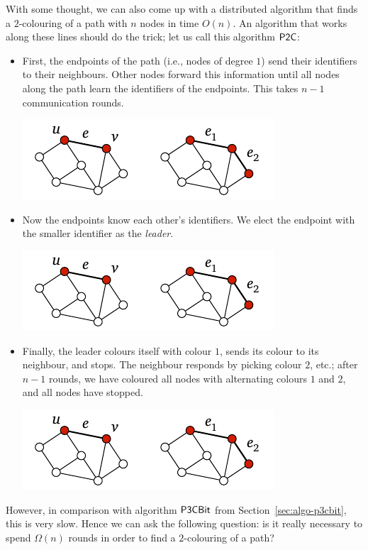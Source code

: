 With some thought, we can also come up with a distributed algorithm that finds a $2$-colouring of a path with $n$ nodes in time $O(n)$. An algorithm that works along these lines should do the trick; let us call this algorithm $\textup{\sffamily P2C}$:
\begin{itemize}
    \item First, the endpoints of the path (i.e., nodes of degree $1$) send their identifiers to their neighbours. Other nodes forward this information until all nodes along the path learn the identifiers of the endpoints. This takes $n-1$ communication rounds.
    \begin{center}
        \includegraphics[page=\PIntroTwoColA]{figs.pdf}
    \end{center}
    \item Now the endpoints know each other's identifiers. We elect the endpoint with the smaller identifier as the \emph{leader}.
    \begin{center}
        \includegraphics[page=\PIntroTwoColB]{figs.pdf}
    \end{center}
    \item Finally, the leader colours itself with colour $1$, sends its colour to its neighbour, and stops. The neighbour responds by picking colour $2$, etc.; after $n-1$ rounds, we have coloured all nodes with alternating colours $1$ and $2$, and all nodes have stopped.
    \begin{center}
        \includegraphics[page=\PIntroColTwo]{figs.pdf}
    \end{center}
\end{itemize}
However, in comparison with algorithm $\textup{\sffamily P3CBit}$ from Section~\ref{sec:algo-p3cbit}, this is very slow. Hence we can ask the following question: is it really necessary to spend $\Omega(n)$ rounds in order to find a $2$-colouring of a path?



